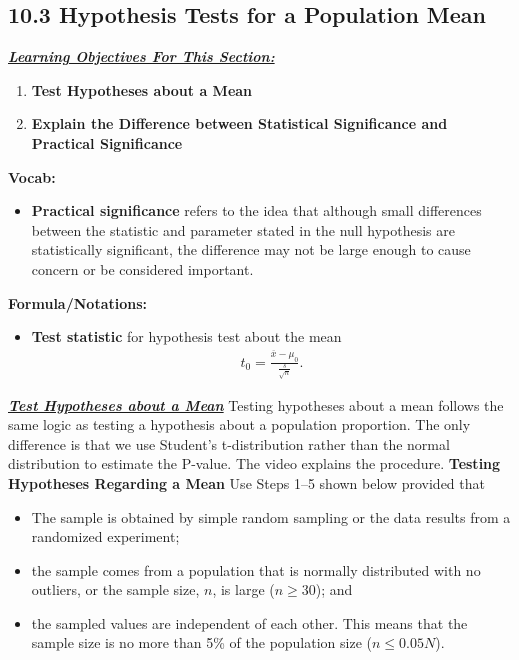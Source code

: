 \documentclass{report}
\begin{document}
    \subsection*{10.3 Hypothesis Tests for a Population Mean}
    \bigbreak \noindent 
    \bigbreak \noindent 
    \textbf{\textit{\underline{Learning Objectives For This Section:}}}
    \begin{enumerate}
        \item \textbf{Test Hypotheses about a Mean}
        \item \textbf{Explain the Difference between Statistical Significance and Practical Significance}
    \end{enumerate}
    \bigbreak \noindent 
    \textbf{Vocab:}
    \begin{itemize}
        \item \textbf{Practical significance} refers to the idea that although small differences between the statistic and parameter stated in the null hypothesis are statistically significant, the difference may not be large enough to cause concern or be considered important. 
    \end{itemize}
    \bigbreak \noindent 
    \textbf{Formula/Notations:}
    \begin{itemize}
        \item \textbf{Test statistic} for hypothesis test about the mean
            \begin{align*}
                t_{0} = \frac{\overline{x}- \mu_{0}}{\frac{s}{\sqrt{n}}}
            .\end{align*}
    \end{itemize}
    \pagebreak \bigbreak \noindent 
    \textbf{\textit{\underline{Test Hypotheses about a Mean}}}
    \bigbreak \noindent 
    Testing hypotheses about a mean follows the same logic as testing a hypothesis about a population proportion. The only difference is that we use Student’s t-distribution rather than the normal distribution to estimate the P-value. The video explains the procedure.
    \bigbreak \noindent 
    \textbf{Testing Hypotheses Regarding a Mean}
    \bigbreak \noindent 
    Use Steps 1–5 shown below provided that
    \begin{itemize}
        \item The sample is obtained by simple random sampling or the data results from a randomized experiment;
        \item the sample comes from a population that is normally distributed with no outliers, or the sample size, $n$, is large ($n \geq 30$); and
        \item the sampled values are independent of each other. This means that the sample size is no more than 5\% of the population size ($n \leq 0.05N$).
    \end{itemize}
\end{document}
